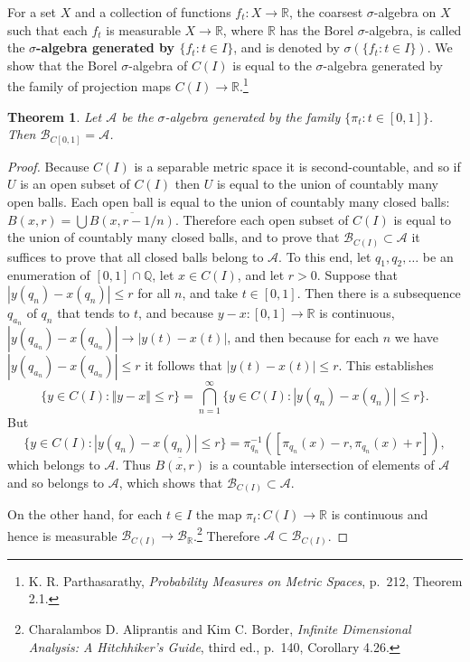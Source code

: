 \documentclass{article}
\newcommand{\norm}[1]{\left\Vert #1 \right\Vert}
\newtheorem{theorem}{Theorem}
\theoremstyle{definition}
\begin{document}
For a set $X$ and a collection of functions $f_t:X \to \mathbb{R}$,
the coarsest $\sigma$-algebra on $X$ such that each $f_t$ is measurable
$X \to \mathbb{R}$, where $\mathbb{R}$ has the Borel $\sigma$-algebra, is called
the \textbf{$\sigma$-algebra generated by $\{f_t:t \in I\}$}, and is
denoted
by $\sigma(\{f_t: t \in I\})$. 
We show that the Borel $\sigma$-algebra of $C(I)$ is equal to the $\sigma$-algebra generated by the family
of projection maps $C(I) \to \mathbb{R}$.\footnote{K. R. Parthasarathy, {\em Probability Measures on
Metric Spaces}, p.~212, Theorem 2.1.}


\begin{theorem}
Let $\mathscr{A}$ be the $\sigma$-algebra generated by the family $\{\pi_t:t \in [0,1]\}$. Then
$\mathscr{B}_{C[0,1]}=\mathscr{A}$.
\end{theorem}
\begin{proof}
Because $C(I)$ is a separable metric space it is second-countable, and so if $U$ is an open subset of $C(I)$ then $U$ is equal to the union of countably many open balls. Each open ball
is equal to the union of countably many closed balls: $B(x,r)=\bigcup \overline{B(x,r-1/n)}$. Therefore each open subset of $C(I)$ is equal to
the union of countably many closed balls, and
 to prove that $\mathscr{B}_{C(I)} \subset \mathscr{A}$ it suffices to prove that all closed balls belong to $\mathscr{A}$. 
To this end, 
let $q_1,q_2,\ldots$ be an enumeration of $[0,1] \cap \mathbb{Q}$, 
let $x \in C(I)$, and let $r>0$.  
Suppose that $|y(q_n)-x(q_n)| \leq r$ for all $n$, and take $t \in [0,1]$. Then there is a subsequence
$q_{a_n}$ of $q_n$ that tends to $t$, 
and because $y-x:[0,1] \to \mathbb{R}$ is continuous, 
$|y(q_{a_n})-x(q_{a_n})| \to |y(t)-x(t)|$, and then because for each $n$ we have
$|y(q_{a_n})-x(q_{a_n})| \leq r$ it follows that $|y(t)-x(t)| \leq r$. 
This establishes
\[
\{y \in C(I): \norm{y-x} \leq r\}
=\bigcap_{n=1}^\infty \{y \in C(I): |y(q_n)-x(q_n)| \leq r\}.
\]
But
\[
\{y \in C(I): |y(q_n)-x(q_n)| \leq r\} = \pi_{q_n}^{-1}([\pi_{q_n}(x)-r,\pi_{q_n}(x)+r]),
\]
which belongs to $\mathscr{A}$. Thus $\overline{B(x,r)}$ 
is a countable intersection of elements of $\mathscr{A}$ and so belongs to $\mathscr{A}$, which shows
that $\mathscr{B}_{C(I)} \subset \mathscr{A}$.

On the other hand, for each $t \in I$ the map $\pi_t:C(I) \to \mathbb{R}$ is continuous and hence is
measurable $\mathscr{B}_{C(I)} \to \mathscr{B}_{\mathbb{R}}$.\footnote{Charalambos D. Aliprantis
and Kim C. Border, {\em Infinite Dimensional Analysis: A Hitchhiker's Guide}, third ed., p.~140, Corollary 4.26.}
Therefore  $\mathscr{A} \subset \mathscr{B}_{C(I)}$.
\end{proof}
\end{document}
